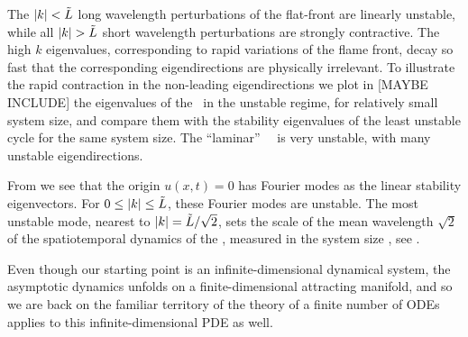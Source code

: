 The $|k|<\tilde{L}$
long wavelength perturbations of the flat-front {\eqv}
are linearly unstable, while all
$|k|> \tildeL$ short wavelength perturbations are strongly contractive.
The high $k$ eigenvalues, corresponding to rapid variations of
the flame front, decay so fast that the corresponding eigendirections
are physically irrelevant.
To illustrate the rapid contraction in the non-leading eigendirections
we plot  in [MAYBE INCLUDE] %
the eigenvalues of the \eqv\ in the unstable regime,
for relatively small system size, %
and compare them with the
stability eigenvalues of the least unstable cycle for the same
system size.
The ``laminar'' ~\eqv\ is very unstable,
with many unstable eigendirections.


From  we see that the origin $u(x,t) = 0$
has Fourier modes as the  linear
stability eigenvectors.
For $0 \leq |k| \leq \tilde{L}$, these Fourier modes are
unstable.
The most unstable mode, nearest to $|k|=\tilde{L}/\sqrt{2}$,
sets the scale of the mean wavelength $\sqrt{2}$
of the spatiotemporal dynamics of the {\KSe},
measured in the system size \tildeL, see .


%
%

Even though our starting point
is an infinite-dimensional dynamical system, the asymptotic dynamics
unfolds on a finite-dimensional attracting manifold, and so we are back on
the familiar territory of
the theory of a finite number of ODEs applies to this
infinite-dimensional PDE as well.


